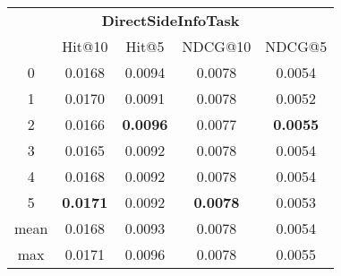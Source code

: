 \documentclass{article}
\begin{document}
 

\begin{tabular}{c|cccc}

\multicolumn{5}{c}{\textbf{DirectSideInfoTask}} \\
\noalign{\smallskip}
\noalign{\smallskip}
\toprule
\multicolumn{1}{c}{Template ID} & \multicolumn{1}{|c}{Hit@10} & \multicolumn{1}{c}{Hit@5} & \multicolumn{1}{c}{NDCG@10} & \multicolumn{1}{c}{NDCG@5} \\
\midrule
0 & 0.0168 & 0.0094 & 0.0078 & 0.0054 \\
1 & 0.0170 & 0.0091 & 0.0078 & 0.0052 \\
2 & 0.0166 & \textbf{0.0096} & 0.0077 & \textbf{0.0055} \\
3 & 0.0165 & 0.0092 & 0.0078 & 0.0054 \\
4 & 0.0168 & 0.0092 & 0.0078 & 0.0054 \\
5 & \textbf{0.0171} & 0.0092 & \textbf{0.0078} & 0.0053 \\
\midrule
mean & 0.0168 & 0.0093 & 0.0078 & 0.0054 \\
max & 0.0171 & 0.0096 & 0.0078 & 0.0055 \\
\bottomrule

\end{tabular}
\end{document}
